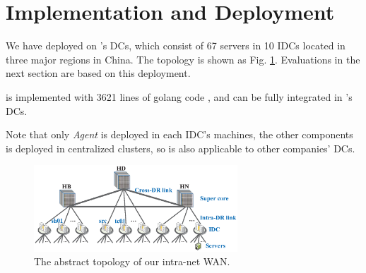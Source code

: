 \section{Implementation and Deployment}
\label{sec:deployment}

We have deployed \name on \company's DCs, which consist of 67 servers in 10 IDCs located in three major regions in China. The topology is shown as Fig. \ref{fig:topology}. Evaluations in the next section are based on this deployment.

\name is implemented with 3621 lines of golang code \cite{golang}, and can be fully integrated in \company's DCs.

%

Note that only \emph{Agent} is deployed in each IDC's machines, the other components is deployed in centralized clusters, so \name is also applicable to other companies' DCs. 	

\begin{figure}[t]
  \centering
  \includegraphics[width=3in]{images/Testbed_v2.eps}
  \caption{The abstract topology of our intra-net WAN.}
  \label{fig:topology}
\end{figure}
\vspace{-15pt}


